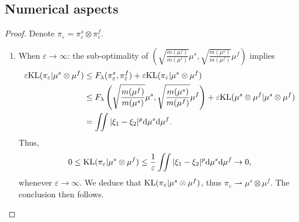\subsection{Numerical aspects}
\begin{proof}
  Denote $\pi_{\varepsilon} = \pi_{\varepsilon}^s \otimes \pi_{\varepsilon}^f$.
  \begin{enumerate}
    \item When $\varepsilon \to \infty$: the sub-optimality of
    $\left( \sqrt{\frac{m(\mu^f)}{m(\mu^s)}} \mu^s, \sqrt{\frac{m(\mu^s)}{m(\mu^f)}} \mu^f \right)$
    implies
    \begin{equation}
      \begin{split}
        \varepsilon \text{KL}(\pi_{\varepsilon} \vert \mu^s \otimes \mu^f)
        &\leq F_{\lambda}(\pi_{\varepsilon}^s, \pi_{\varepsilon}^f) +
        \varepsilon \text{KL}(\pi_{\varepsilon} \vert \mu^s \otimes \mu^f) \\
        &\leq F_{\lambda} \left( \sqrt{\frac{m(\mu^f)}{m(\mu^s)}} \mu^s, \sqrt{\frac{m(\mu^s)}{m(\mu^f)}} \mu^f \right) +
        \varepsilon \text{KL}( \mu^s \otimes \mu^f \vert \mu^s \otimes \mu^f) \\
        &= \iint \vert \xi_1 - \xi_2 \vert^p \mathrm d\mu^s \mathrm d\mu^f.
      \end{split}
    \end{equation}
    Thus,
    \begin{equation}
      0 \leq \text{KL}(\pi_{\varepsilon} \vert \mu^s \otimes \mu^f)
      \leq \frac{1}{\varepsilon} \iint \vert \xi_1 - \xi_2 \vert^p
      \mathrm d\mu^s \mathrm d\mu^f \to 0,
    \end{equation}
    whenever $\varepsilon \to \infty$. We deduce that
    $\text{KL}(\pi_{\varepsilon} \vert \mu^s \otimes \mu^f)$,
    thus $\pi_{\varepsilon} \rightharpoonup \mu^s \otimes \mu^f$. The conclusion then follows.


\end{enumerate}
\end{proof}
